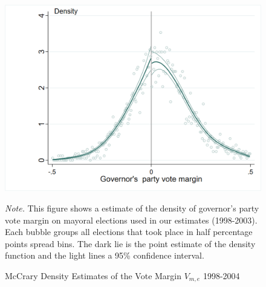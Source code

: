 \documentclass[dv_diss_main.tex]{subfiles}
\begin{document}
\begin{figure}[h!]
    \begin{center}
			\includegraphics[width=0.8\linewidth]{figures/McCraryGraph.png}
			\caption{McCrary Density Estimates of the Vote Margin $V_{m,e}$ 1998-2004}\label{fig:mccrary}
    \end{center}
	\vspace{0.5em}
	\begin{figurenotes}
    \footnotesize	
     \textit{Note. }This figure shows a estimate of the density of governor's party vote margin on mayoral elections used in our estimates (1998-2003). Each bubble groups all elections that took place in half percentage points spread bins. The dark lie is the point estimate of the density function and the light lines a 95\% confidence interval.
	\end{figurenotes}
\end{figure}

\newpage
\end{document}
